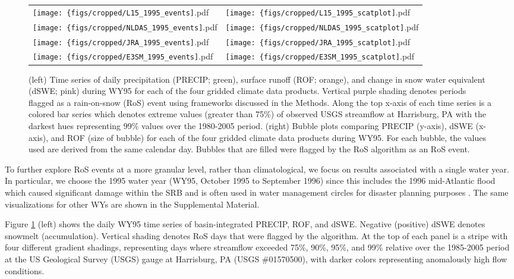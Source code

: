 \documentclass[draft]{agujournal2019}
\begin{document}
\begin{figure}
\centering
\begin{tabularx}{\textwidth}{XX}
\texttt{[image: \{figs/cropped/L15\_1995\_events]}.pdf} & \texttt{[image: \{figs/cropped/L15\_1995\_scatplot]}.pdf} \\ \texttt{[image: \{figs/cropped/NLDAS\_1995\_events]}.pdf} & \texttt{[image: \{figs/cropped/NLDAS\_1995\_scatplot]}.pdf} \\
    \texttt{[image: \{figs/cropped/JRA\_1995\_events]}.pdf} & \texttt{[image: \{figs/cropped/JRA\_1995\_scatplot]}.pdf} \\\texttt{[image: \{figs/cropped/E3SM\_1995\_events]}.pdf} & \texttt{[image: \{figs/cropped/E3SM\_1995\_scatplot]}.pdf}
\end{tabularx}
\caption{(left) Time series of daily precipitation (PRECIP; green), surface runoff (ROF; orange), and change in snow water equivalent (dSWE; pink) during WY95 for each of the four gridded climate data products. Vertical purple shading denotes periods flagged as a rain-on-snow (RoS) event using frameworks discussed in the Methods. Along the top x-axis of each time series is a colored bar series which denotes extreme values (greater than 75\%) of observed USGS streamflow at Harrisburg, PA with the darkest hues representing 99\% values over the 1980-2005 period. (right) Bubble plots comparing PRECIP (y-axis), dSWE (x-axis), and ROF (size of bubble) for each of the four gridded climate data products during WY95. For each bubble, the values used are derived from the same calendar day. Bubbles that are filled were flagged by the RoS algorithm as an RoS event.}
\label{fig:merged-wy}
\end{figure}

To further explore RoS events at a more granular level, rather than climatological, we focus on results associated with a single water year. 
In particular, we choose the 1995 water year (WY95, October 1995 to September 1996) since this includes the 1996 mid-Atlantic flood which caused significant damage within the SRB and is often used in water management circles for disaster planning purposes \citep{leathers1998severe}. 
The same visualizations for other WYs are shown in the Supplemental Material.

Figure \ref{fig:merged-wy} (left) shows the daily WY95 time series of basin-integrated PRECIP, ROF, and dSWE.
Negative (positive) dSWE denotes snowmelt (accumulation). 
Vertical shading denotes RoS days that were flagged by the algorithm. 
At the top of each panel is a stripe with four different gradient shadings, representing days where streamflow exceeded 75\%, 90\%, 95\%, and 99\% relative over the 1985-2005 period at the US Geological Survey (USGS) gauge at Harrisburg, PA (USGS \#01570500), with darker colors representing anomalously high flow conditions.
\end{document}
